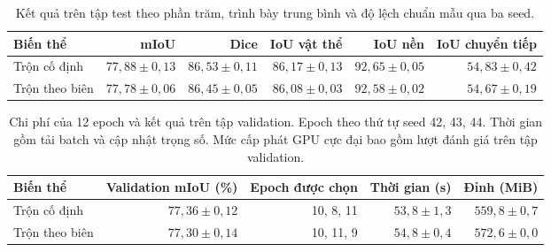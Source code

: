 \begin{table}[htbp]\centering\small
\begin{tabular}{@{}lrrrrr@{}}\toprule
Biến thể & mIoU & Dice & IoU vật thể & IoU nền & IoU chuyển tiếp\\\midrule
Trộn cố định & $77{,}88 \pm 0{,}13$ & $86{,}53 \pm 0{,}11$ & $86{,}17 \pm 0{,}13$ & $92{,}65 \pm 0{,}05$ & $54{,}83 \pm 0{,}42$\\
Trộn theo biên & $77{,}78 \pm 0{,}06$ & $86{,}45 \pm 0{,}05$ & $86{,}08 \pm 0{,}03$ & $92{,}58 \pm 0{,}02$ & $54{,}67 \pm 0{,}19$\\
\bottomrule\end{tabular}
\caption{Kết quả trên tập test theo phần trăm, trình bày trung bình và độ lệch chuẩn mẫu qua ba seed.}
\label{tab:results}\end{table}

\begin{table}[htbp]\centering\small
\begin{tabular}{@{}lrrrr@{}}\toprule
Biến thể & Validation mIoU (\%) & Epoch được chọn & Thời gian (s) & Đỉnh (MiB)\\\midrule
Trộn cố định & $77{,}36 \pm 0{,}12$ & 10, 8, 11 & $53{,}8 \pm 1{,}3$ & $559{,}8 \pm 0{,}7$\\
Trộn theo biên & $77{,}30 \pm 0{,}14$ & 10, 11, 9 & $54{,}8 \pm 0{,}4$ & $572{,}6 \pm 0{,}0$\\
\bottomrule\end{tabular}
\caption{Chi phí của 12 epoch và kết quả trên tập validation. Epoch theo thứ tự seed 42, 43, 44. Thời gian gồm tải batch và cập nhật trọng số. Mức cấp phát GPU cực đại bao gồm lượt đánh giá trên tập validation.}
\label{tab:cost}\end{table}

